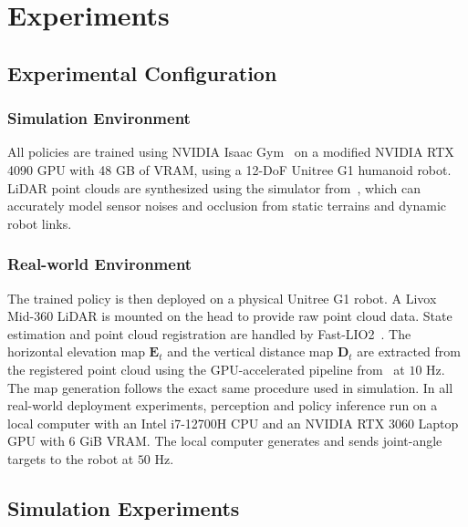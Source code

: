 \section{Experiments}
\label{sec:experiment}

\subsection{Experimental Configuration}
\label{sec:method_terrain}

\subsubsection{Simulation Environment} All policies are trained using NVIDIA Isaac Gym~\cite{Isaac_Gym} on a modified NVIDIA RTX 4090 GPU with 48 GB of VRAM, using a 12-DoF Unitree G1 humanoid robot. LiDAR point clouds are synthesized using the simulator from~\cite{Wang_2025_Omni-Perception}, which can accurately model sensor noises and occlusion from static terrains and dynamic robot links.

\subsubsection{Real-world Environment} The trained policy is then deployed on a physical Unitree G1 robot. A Livox Mid-360 LiDAR is mounted on the head to provide raw point cloud data. State estimation and point cloud registration are handled by Fast-LIO2~\cite{Xu_2022_FAST-LIO2}. The horizontal elevation map $\mathbf{E}_t$ and the vertical distance map $\mathbf{D}_t$ are extracted from the registered point cloud using the GPU-accelerated pipeline from~\cite{ElevationMap_GPU_2022} at $10$ Hz. 
The map generation follows the exact same procedure used in simulation. In all real-world deployment experiments, perception and policy inference run on a local computer with an Intel i7-12700H CPU and an NVIDIA RTX 3060 Laptop GPU with 6 GiB VRAM. The local computer generates and sends joint-angle targets to the robot at $50$ Hz.

\subsection{Simulation Experiments}
